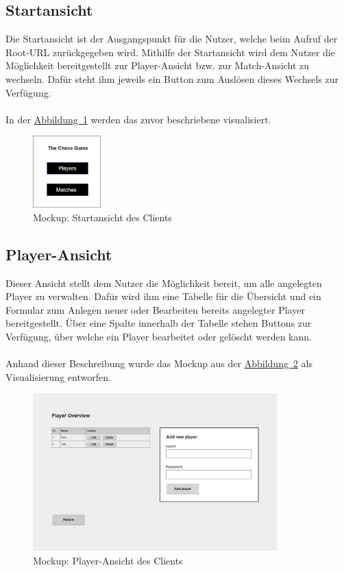 \subsection{Startansicht}\label{sec:startView}
Die Startansicht ist der Ausgangspunkt für die Nutzer, welche beim Aufruf der Root-\gls{URL} zurückgegeben wird. Mithilfe der Startansicht wird dem Nutzer die Möglichkeit bereitgestellt zur Player-Ansicht bzw. zur Match-Ansicht zu wechseln. Dafür steht ihm jeweils ein Button zum Auslösen dieses Wechsels zur Verfügung.\\
\\
In der \hyperref[fig:startView]{Abbildung~\ref{fig:startView}} werden das zuvor beschriebene visualisiert.
\begin{figure}[htb]
	\includegraphics[width=0.234\textwidth]{images/start-view.png}
	\caption{Mockup: Startansicht des Clients}
	\label{fig:startView}
\end{figure}

\subsection{Player-Ansicht}\label{sec:playerView}
Dieser Ansicht stellt dem Nutzer die Möglichkeit bereit, um alle angelegten Player zu verwalten. Dafür wird ihm eine Tabelle für die Übersicht und ein Formular zum Anlegen neuer oder Bearbeiten bereits angelegter Player bereitgestellt. Über eine Spalte innerhalb der Tabelle stehen Buttons zur Verfügung, über welche ein Player bearbeitet oder gelöscht werden kann.\\
\\
Anhand dieser Beschreibung wurde das Mockup aus der \hyperref[fig:playerView]{Abbildung~\ref{fig:playerView}} als Visualisierung entworfen.
\begin{figure}[htb]
	\includegraphics[width=0.84\textwidth]{images/player-view.png}
	\caption{Mockup: Player-Ansicht des Clients}
	\label{fig:playerView}
\end{figure}

